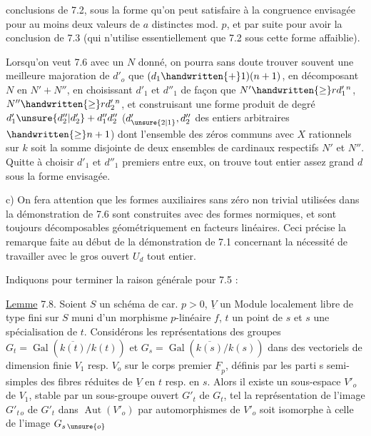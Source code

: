 conclusions de 7.2, sous la forme  qu'on peut  satisfaire à la congruence envisagée pour au moins deux valeurs de $a$ distinctes mod. $p$, et par suite pour avoir la conclusion de 7.3 (qui n'utilise essentiellement que 7.2 sous cette forme affaiblie).

 Lorsqu'on veut 7.6 avec un $N$ donné, on  pourra sans doute trouver souvent une meilleure majoration de $d'_o$ que $(d_1\handwritten{+}1)(n+1)$, en décomposant $N$ en $N'+N''$, en choisissant $d'_1$ et $d''_1$ de façon que $N'\handwritten{\geq}rd_1'{}^n$, $N''\handwritten{\geq}rd_2'{}^n$, et construisant une forme produit de degré  $d'_1\unsure{d''_2|d'_2}+d''_1d''_2$ ($d'_{\unsure{2|1}},d''_2$ des entiers arbitraires $\handwritten{\geq}n+1$) dont l'ensemble des zéros communs avec $X$ rationnels sur $k$ soit la somme disjointe de deux ensembles de cardinaux respectifs $N'$ et $N''$. Quitte à choisir $d'_1$ et $d''_1$  premiers entre eux, on trouve  tout entier assez grand $d$  sous la forme envisagée.

c) On fera attention que les formes auxiliaires sans zéro non trivial utilisées dans la démonstration de 7.6 sont construites avec des formes normiques, et sont toujours décomposables géométriquement en facteurs linéaires. Ceci précise la remarque faite au début de la démonstration de 7.1 concernant la nécessité de travailler avec le gros ouvert $U_d$ tout entier.

Indiquons pour terminer la raison générale pour 7.5 :

\uline{Lemme} 7.8. Soient $S$ un schéma de car. $p>0$, $\underline{V}$ un Module localement libre de type fini sur $S$ muni d'un morphisme $p$-linéaire $f$, $t$ un point de $s$ et $s$ une spécialisation de $t$. Considérons les représentations des groupes $G_t=\operatorname{Gal}(\overline{k(t)}/k(t))$ et $G_s=\operatorname{Gal}(\overline{k(s)}/k(s))$ dans des vectoriels de dimension finie $V_1$ resp. $V_o$ sur le corps premier $\underline{F}_p$, définis par les parti s semi-simples des fibres  réduites de $\underline{V}$ en $t$ resp. en $s$. Alors il existe un sous-espace $V'_o$ de $V_1$, stable par un sous-groupe ouvert $G'_t$ de $G_t$, tel  la représentation de l'image $G'_{t\,o}$ de $G'_t$ dans  $\operatorname{Aut}(V'_o)$ par automorphismes de $V'_o$ soit isomorphe à celle de l'image $G_{s\,\unsure{o}}$
